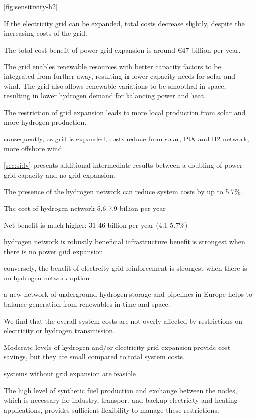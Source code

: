 \cref{fig:sensitivity-h2}


If the electricity grid can be expanded, total costs decrease
slightly, despite the increasing costs of the grid.

The
total cost benefit of power grid expansion is around
\euro47~billion per year.

The grid enables
renewable resources with better capacity factors to be integrated from
further away, resulting in lower capacity needs for solar and
wind. The grid also allows renewable variations to be smoothed in space,
resulting in lower hydrogen demand for balancing power and heat.

The restriction of grid
expansion leads to more local production from solar and more hydrogen
production.

consequently, as grid is expanded, costs reduce from solar, PtX and H2 network, more offshore wind

\cref{sec:si:lv} presents additional intermediate results between a doubling of
power grid capacity and no grid expansion.


The presence of the hydrogen network can reduce system costs by up to 5.7\%.

The cost of hydrogen network 5.6-7.9 billion per year

Net benefit is much higher: 31-46 billion per year (4.1-5.7\%)

hydrogen network is robustly beneficial infrastructure
benefit is strongest when there is no power grid expansion

conversely, the benefit of electrcity grid reinforcement is strongest
when there is no hydrogen network option

a new network
of underground hydrogen storage and pipelines in Europe helps to balance
generation from renewables in time and space.


We find that the overall system costs are not overly affected
by restrictions on electricity or hydrogen transmission.

Moderate levels of hydrogen and/or electricity grid expansion provide cost
savings, but they are small compared to total system costs.

systems without grid expansion are feasible

The high level of synthetic fuel production and exchange between the nodes, which is
necessary for industry, transport and backup electricity and heating
applications, provides sufficient flexibility to manage these
restrictions.

